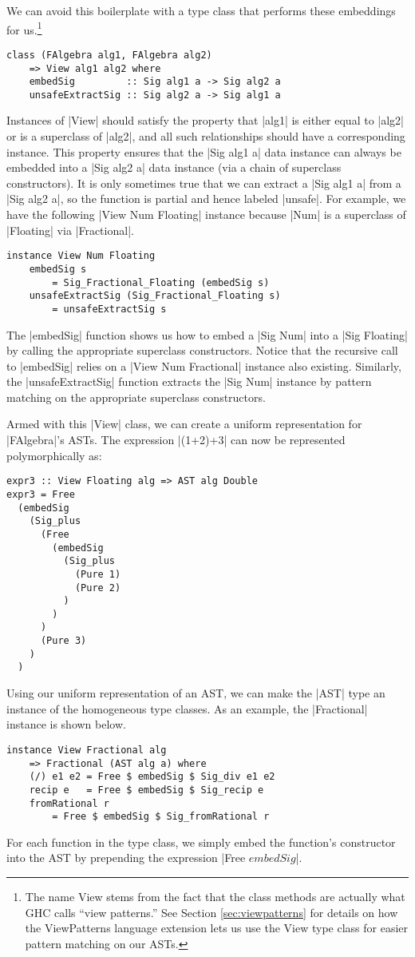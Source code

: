 \documentclass[preprint]{sigplanconf}
\theoremstyle{definition}
\begin{document}
We can avoid this boilerplate with a type class that performs these embeddings for us.\footnote{
    The name {\ttfamily View} stems from the fact that the class methods are actually what GHC calls ``view patterns.''
    See Section \ref{sec:viewpatterns} for details on how the {\ttfamily ViewPatterns} language extension lets us use the {\ttfamily View} type class for easier pattern matching on our ASTs.
}
\begin{lstlisting}
class (FAlgebra alg1, FAlgebra alg2)
    => View alg1 alg2 where
    embedSig         :: Sig alg1 a -> Sig alg2 a
    unsafeExtractSig :: Sig alg2 a -> Sig alg1 a
\end{lstlisting}
Instances of |View| should satisfy the property that |alg1| is either equal to |alg2| or is a superclass of |alg2|, and
all such relationships should have a corresponding instance.
This property ensures that the |Sig alg1 a| data instance can always be embedded into a |Sig alg2 a| data instance (via a chain of superclass constructors).
It is only sometimes true that we can extract a |Sig alg1 a| from a |Sig alg2 a|,
so the function is partial and hence labeled |unsafe|.
For example,
we have the following |View Num Floating| instance because |Num| is a superclass of |Floating| via |Fractional|.
\begin{lstlisting}
instance View Num Floating
    embedSig s
        = Sig_Fractional_Floating (embedSig s)
    unsafeExtractSig (Sig_Fractional_Floating s)
        = unsafeExtractSig s
\end{lstlisting}
The |embedSig| function shows us how to embed a |Sig Num| into a |Sig Floating| by calling the appropriate superclass constructors.
Notice that the recursive call to |embedSig| relies on a |View Num Fractional| instance also existing.
Similarly, the |unsafeExtractSig| function extracts the |Sig Num| instance by pattern matching on the appropriate superclass constructors.

Armed with this |View| class, we can create a uniform representation for |FAlgebra|'s ASTs.
The expression |(1+2)+3| can now be represented polymorphically as:
\begin{lstlisting}
expr3 :: View Floating alg => AST alg Double
expr3 = Free
  (embedSig
    (Sig_plus
      (Free
        (embedSig
          (Sig_plus
            (Pure 1)
            (Pure 2)
          )
        )
      )
      (Pure 3)
    )
  )
\end{lstlisting}

Using our uniform representation of an AST,
we can make the |AST| type an instance of the homogeneous type classes.
As an example, the |Fractional| instance is shown below.
\begin{lstlisting}
instance View Fractional alg
    => Fractional (AST alg a) where
    (/) e1 e2 = Free $ embedSig $ Sig_div e1 e2
    recip e   = Free $ embedSig $ Sig_recip e
    fromRational r
        = Free $ embedSig $ Sig_fromRational r
\end{lstlisting}
For each function in the type class,
we simply embed the function's constructor into the AST by prepending the expression |Free $ embedSig $|.
\end{document}
